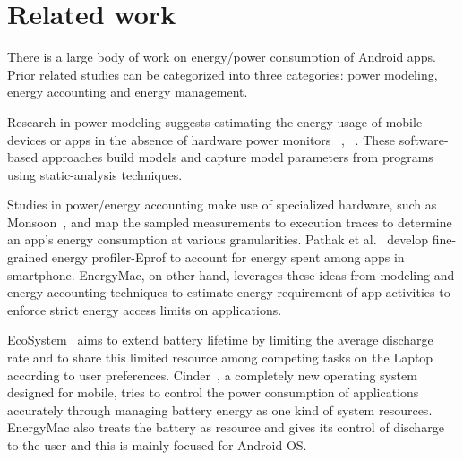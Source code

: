 \section{Related work}
\label{related}


There is a large body of work on energy/power consumption of Android apps. Prior related studies can be categorized into three categories: power modeling, energy accounting and energy management.

Research in power modeling suggests estimating the energy usage of mobile devices or apps in the absence of hardware power
monitors ~\cite{hao2013estimating}, ~\cite{li2013calculating}. These software-based approaches build models and capture model parameters from programs using static-analysis techniques.
 
Studies in power/energy accounting make use of specialized hardware, such as Monsoon~\cite{yoon2012appscope}, and map the sampled measurements to execution traces to determine an app's energy consumption at various granularities. Pathak et al.~\cite{pathak2012energy} develop fine-grained energy profiler-Eprof  to account for energy spent among apps in smartphone. EnergyMac, on other hand, leverages these ideas from modeling and energy accounting techniques to estimate energy requirement of app activities to enforce strict energy access limits on applications.


EcoSystem~\cite{zeng2002ecosystem} aims to extend battery lifetime by limiting the average discharge rate and to share this limited resource among competing tasks on the Laptop according to user preferences. Cinder~\cite{roy2011energy}, a completely new operating system designed for mobile, tries to control the power consumption of applications accurately through managing battery energy as one kind of system resources. EnergyMac also treats the battery as resource and gives its control of discharge  to the user and this is mainly focused for Android OS.










